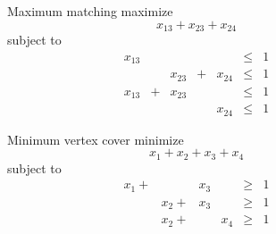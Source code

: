\documentclass[hyperref={pdfpagelabels=false}]{beamer}
\begin{document}
{	\begin{center}
	\begin{figure}[h]
		\hfill
		\centering
		\begin{minipage}[c]{.45\textwidth}
		\centering
		\begin{block}{Maximum matching}
		maximize
		\begin{equation*}
		x_{13} + x_{23} + x_{24}
		\end{equation*}
		subject to
		\begin{equation*}
		\begin{array}{ccccccc}
	  	x_{13} &   &        &   &        & \leq & 1\\
		       &   & x_{23} & + & x_{24} & \leq & 1\\
		x_{13} & + & x_{23} &   &        & \leq & 1\\
		       &   &        &   & x_{24} & \leq & 1
	  	\end{array}
	  	\end{equation*}
		\end{block}
		\end{minipage}
		\hfill
		\centering
		\begin{minipage}[c]{.45\textwidth}
		\centering
		\begin{block}{Minimum vertex cover}
		minimize
		\begin{equation*}
		x_{1} + x_{2} + x_{3} + x_{4}
		\end{equation*}
		subject to
		\begin{equation*}
		\begin{array}{cccccccc}
	  	x_{1}+ &        & x_{3} &       & \geq & 1\\
		       & x_{2}+ & x_{3} &       & \geq & 1\\
		       & x_{2}+ &       & x_{4} & \geq & 1\\
		       &        &       &       &      &  \\
	  	\end{array}
	  	\end{equation*}
		\end{block}
		\end{minipage}
		\hfill
	\end{figure}
	\end{center}
}
\end{document}
